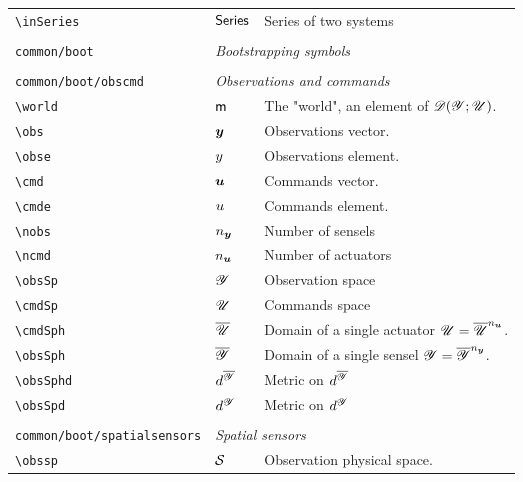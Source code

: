 \begin{longtable}{lll}
 {\color[rgb]{0.5,0.5,0.5}\texttt{\textbackslash inSeries}} & $\mathsf{Series}$ &  Series of two systems\\ 
  &  & \\ 
 {\color[rgb]{0.5,0.5,0.5}\texttt{common/boot}} & \multicolumn{2}{l}{\emph{Bootstrapping symbols}}\\ 
 \hline
 &  & \\ 
 {\color[rgb]{0.5,0.5,0.5}\texttt{common/boot/obscmd}} & \multicolumn{2}{l}{\emph{Observations and commands}}\\ 
 \hline
{\color[rgb]{0.5,0.5,0.5}\texttt{\textbackslash world}} & $\textsf{m}$ &  The "world", an element of $\mathscr{D}(\mathscr{Y};\mathscr{U})$.\\ 
 {\color[rgb]{0.5,0.5,0.5}\texttt{\textbackslash obs}} & $\boldsymbol{y}$ &  Observations vector.\\ 
 {\color[rgb]{0.5,0.5,0.5}\texttt{\textbackslash obse}} & $y$ &  Observations element.\\ 
 {\color[rgb]{0.5,0.5,0.5}\texttt{\textbackslash cmd}} & $\boldsymbol{u}$ &  Commands vector.\\ 
 {\color[rgb]{0.5,0.5,0.5}\texttt{\textbackslash cmde}} & $u$ &  Commands element.\\ 
 {\color[rgb]{0.5,0.5,0.5}\texttt{\textbackslash nobs}} & ${n_{\boldsymbol{y}}}$ &  Number of sensels\\ 
 {\color[rgb]{0.5,0.5,0.5}\texttt{\textbackslash ncmd}} & ${n_{\boldsymbol{u}}}$ &  Number of actuators\\ 
 {\color[rgb]{0.5,0.5,0.5}\texttt{\textbackslash obsSp}} & $\mathscr{Y}$ &  Observation space \\ 
 {\color[rgb]{0.5,0.5,0.5}\texttt{\textbackslash cmdSp}} & $\mathscr{U}$ &  Commands space\\ 
 {\color[rgb]{0.5,0.5,0.5}\texttt{\textbackslash cmdSph}} & $\overline{\mathscr{U}}$ &  Domain of a single actuator $\mathscr{U}=\overline{\mathscr{U}}^{n_{\boldsymbol{u}}}$.\\ 
 {\color[rgb]{0.5,0.5,0.5}\texttt{\textbackslash obsSph}} & $\overline{\mathscr{Y}}$ &  Domain of a single sensel $\mathscr{Y}=\overline{\mathscr{Y}}^{n_{\boldsymbol{y}}}$.\\ 
 {\color[rgb]{0.5,0.5,0.5}\texttt{\textbackslash obsSphd}} & $d^{\overline{\mathscr{Y}}}$ &  Metric on $d^{\overline{\mathscr{Y}}}$\\ 
 {\color[rgb]{0.5,0.5,0.5}\texttt{\textbackslash obsSpd}} & $d^{\mathscr{Y}}$ &  Metric on $d^{\mathscr{Y}}$\\ 
  &  & \\ 
 {\color[rgb]{0.5,0.5,0.5}\texttt{common/boot/spatialsensors}} & \multicolumn{2}{l}{\emph{Spatial sensors}}\\ 
 \hline
{\color[rgb]{0.5,0.5,0.5}\texttt{\textbackslash obssp}} & $\obssp$ &  Observation physical space.\\ 

\end{longtable}
